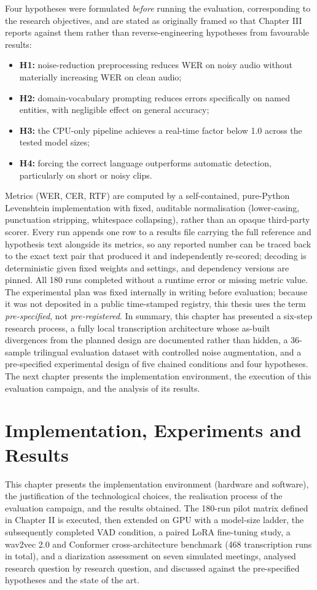 \documentclass[12pt]{report}
\begin{document}
Four hypotheses were formulated \emph{before} running the evaluation, corresponding to the research objectives, and are stated as originally framed so that Chapter III reports against them rather than reverse-engineering hypotheses from favourable results:
\begin{itemize}
    \item \textbf{H1:} noise-reduction preprocessing reduces WER on noisy audio without materially increasing WER on clean audio;
    \item \textbf{H2:} domain-vocabulary prompting reduces errors specifically on named entities, with negligible effect on general accuracy;
    \item \textbf{H3:} the CPU-only pipeline achieves a real-time factor below 1.0 across the tested model sizes;
    \item \textbf{H4:} forcing the correct language outperforms automatic detection, particularly on short or noisy clips.
\end{itemize}
Metrics (WER, CER, RTF) are computed by a self-contained, pure-Python Levenshtein implementation with fixed, auditable normalisation (lower-casing, punctuation stripping, whitespace collapsing), rather than an opaque third-party scorer. Every run appends one row to a results file carrying the full reference and hypothesis text alongside its metrics, so any reported number can be traced back to the exact text pair that produced it and independently re-scored; decoding is deterministic given fixed weights and settings, and dependency versions are pinned. All 180 runs completed without a runtime error or missing metric value. The experimental plan was fixed internally in writing before evaluation; because it was not deposited in a public time-stamped registry, this thesis uses the term \emph{pre-specified}, not \emph{pre-registered}.
\vspace{0.5em}
In summary, this chapter has presented a six-step research process, a fully local transcription architecture whose as-built divergences from the planned design are documented rather than hidden, a 36-sample trilingual evaluation dataset with controlled noise augmentation, and a pre-specified experimental design of five chained conditions and four hypotheses. The next chapter presents the implementation environment, the execution of this evaluation campaign, and the analysis of its results.
\chapter{Implementation, Experiments and Results}
This chapter presents the implementation environment (hardware and software), the justification of the technological choices, the realisation process of the evaluation campaign, and the results obtained. The 180-run pilot matrix defined in Chapter II is executed, then extended on GPU with a model-size ladder, the subsequently completed VAD condition, a paired LoRA fine-tuning study, a wav2vec 2.0 and Conformer cross-architecture benchmark (468 transcription runs in total), and a diarization assessment on seven simulated meetings, analysed research question by research question, and discussed against the pre-specified hypotheses and the state of the art.
\end{document}
